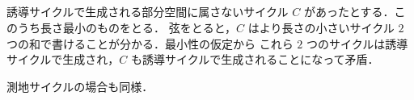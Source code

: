 \subsection{}
誘導サイクルで生成される部分空間に属さないサイクル $C$ があったとする．このうち長さ最小のものをとる．
弦をとると，$C$ はより長さの小さいサイクル $2$ つの和で書けることが分かる．最小性の仮定から
これら $2$ つのサイクルは誘導サイクルで生成され，$C$ も誘導サイクルで生成されることになって矛盾．

測地サイクルの場合も同様．

